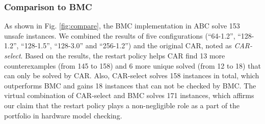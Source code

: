 \subsubsection{Comparison to BMC }
As shown in Fig. \ref{fig:compare}, the BMC implementation in ABC solve 153 unsafe instances. We combined the results of five configurations (``64-1.2'', ``128-1.2'', ``128-1.5'', ``128-3.0'' and ``256-1.2'') and the original CAR, noted as \emph{CAR-select}. Based on the results, the restart policy helps CAR find 13 more counterexamples (from 145 to 158) and 6 more unique solved (from 12 to 18) that can only be solved by CAR. Also, CAR-select solves 158 instances in total, which outperforms BMC and gains 18 instances that can not be checked by BMC. The virtual combination of CAR-select and BMC solves 171 instances, which affirms our claim that the restart policy plays a non-negligible role as a part of the portfolio in hardware model checking.
